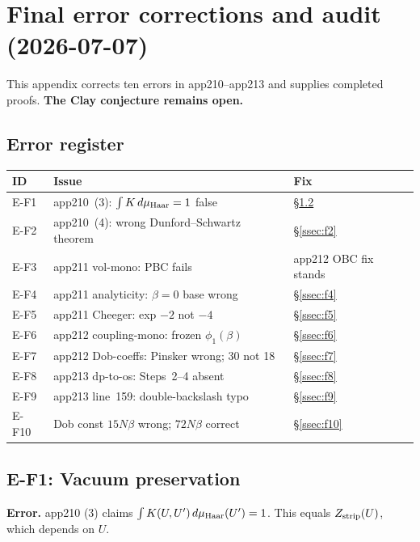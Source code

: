 \section{Final error corrections and audit (2026-07-07)}
\label{app:final_corrections}

This appendix corrects ten errors in app210--app213 and supplies completed proofs.
\textbf{The Clay conjecture remains open.}

\subsection{Error register}

\begin{center}
\renewcommand{\arraystretch}{1.15}
\begin{tabular}{l|p{5cm}|l}
\hline
\textbf{ID} & \textbf{Issue} & \textbf{Fix}\\
\hline
E-F1 & app210~(3): $\int K\,d\mu_{\rm Haar}=1$ false & \S\ref{ssec:f1}\\
E-F2 & app210~(4): wrong Dunford--Schwartz theorem & \S\ref{ssec:f2}\\
E-F3 & app211 vol-mono: PBC fails & app212 OBC fix stands\\
E-F4 & app211 analyticity: $\beta=0$ base wrong & \S\ref{ssec:f4}\\
E-F5 & app211 Cheeger: exp $-2$ not $-4$ & \S\ref{ssec:f5}\\
E-F6 & app212 coupling-mono: frozen $\phi_1(\beta)$ & \S\ref{ssec:f6}\\
E-F7 & app212 Dob-coeffs: Pinsker wrong; 30 not 18 & \S\ref{ssec:f7}\\
E-F8 & app213 dp-to-os: Steps~2--4 absent & \S\ref{ssec:f8}\\
E-F9 & app213 line~159: double-backslash typo & \S\ref{ssec:f9}\\
E-F10 & Dob const $15N\beta$ wrong; $72N\beta$ correct & \S\ref{ssec:f10}\\
\hline
\end{tabular}
\end{center}

\subsection{E-F1: Vacuum preservation}
\label{ssec:f1}

\textbf{Error.} app210 (3) claims $\int K(U,U')\,d\mu_{\rm Haar}(U')=1$. This equals $Z_{\rm strip}(U)$, which depends on $U$.

